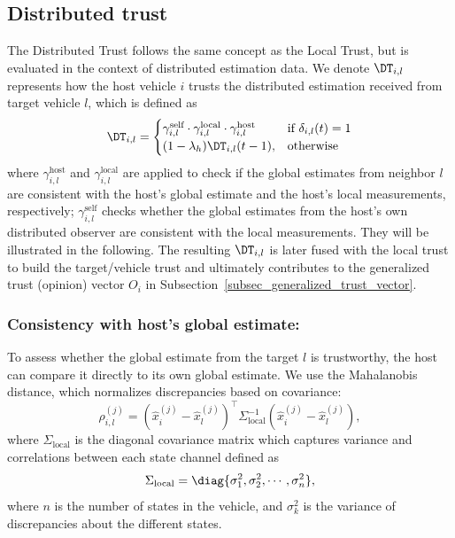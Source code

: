

\subsection{Distributed trust}
\vspace*{-0.3cm}
The Distributed Trust follows the same concept as the Local Trust, but is evaluated in the context of distributed estimation data. We denote $\DT_{i,l}$ represents how the host vehicle $i$ trusts the distributed estimation received from target vehicle $l$, which is defined as
\begin{equation}
        \DT_{i,l}  = \begin{cases}
       \gamma_{i,l}^{\text{self}} \cdot \gamma_{i,l}^{\text{local}} \cdot
        \gamma_{i,l}^{\text{host}}   &  \text{if } \delta_{i,l}(t) = 1 \\
        (1 - \lambda_h)\DT_{i,l}(t-1), & \text{otherwise} \\
    \end{cases}
\end{equation}
where $\gamma_{i,l}^{\text{host}}$ and $\gamma_{i,l}^{\text{local}}$ are applied to check if the global estimates from neighbor $l$ are consistent with the host's global estimate and the host's local measurements, respectively;
$\gamma_{i,l}^{\text{self}}$ checks whether the global estimates from the host's own distributed observer are consistent with the local measurements.
They will be illustrated in the following. 
The resulting $\DT_{i,l}$ is later fused with the local trust to build the target/vehicle trust and ultimately contributes to the generalized trust (opinion) vector $O_i$ in Subsection~\ref{subsec_generalized_trust_vector}.


\subsubsection{Consistency with host's global estimate:}
To assess whether the global estimate from the target $l$ is trustworthy, the host can compare it directly to its own global estimate. 
We use the Mahalanobis distance, which normalizes discrepancies based on covariance:
\begin{equation}
    \rho_{i,l}^{(j)} = \left( \hat{x}_i^{(j)} - \hat{x}_l^{(j)} \right)^{\top} \Sigma_{\text{local}}^{-1} \left( \hat{x}_i^{(j)} - \hat{x}_l^{(j)} \right), 
    \label{eq_dis_glo}
\end{equation}
where $\Sigma_{\text{local}}$ is the diagonal covariance matrix  which captures variance and correlations between each state channel defined as 
\begin{equation}
\Sigma_{\text{local}} = \diag{\sigma^2_1, \sigma^2_2, \cdots , \sigma^2_n},
\end{equation}
where $n$ is the number of states in the vehicle, and $\sigma^2_k$ is  the variance of discrepancies about the different states. 

